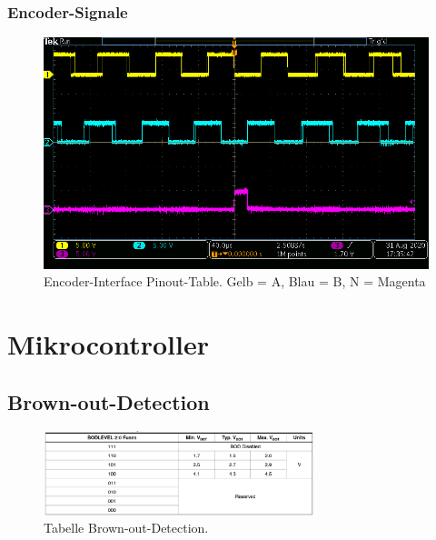\begin{appendix}
\newpage

\subsubsection{Encoder-Signale}\label{Appendix:ABN_Signale}

\begin{figure}[h!]
	\centering
	\includegraphics[width=\textwidth]{graphics/AMT322S-V_Signal}
	\caption{Encoder-Interface Pinout-Table. Gelb = A, Blau = B, N = Magenta}
	\label{fig:AMT322S-V_Signal}
\end{figure}

\newpage

\section{Mikrocontroller}\label{Appendix:Mikrocontroller}

\subsection{Brown-out-Detection}\label{Appendix:Brown-out-Detection}

\begin{figure}[h!]
	\centering
	\includegraphics[width=0.7\textwidth]{graphics/Tabelle_BoD}
	\caption{Tabelle Brown-out-Detection.}
	\label{fig:Tabelle_BoD}
\end{figure}


\end{appendix}

